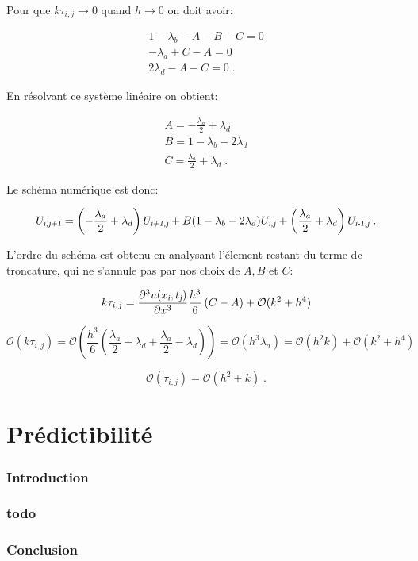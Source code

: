 \documentclass[a4paper, 12pt]{report}
\begin{document}
Pour que $k \tau_{i,j} \to 0$ quand $h \to 0$ on doit avoir:

\begin{align}
  1-\lambda_b - A -B -C = 0\\
  -\lambda_a +C - A =0\\
  2 \lambda_d -A -C = 0\;.
\end{align}

En résolvant ce système linéaire on obtient:

\begin{align}
  A = -\frac{\lambda_a}{2} + \lambda_d\\
  B = 1-\lambda_b - 2\lambda_d\\
  C = \frac{\lambda_a}{2} + \lambda_d\;.
\end{align}

Le schéma numérique est donc:

\begin{equation}
U_{\textsl{i},\textsl{j+1}} = \left ( -\frac{\lambda_a}{2} + \lambda_d \right ) U_{\textsl{i+1},\textsl{j}} + B (1-\lambda_b - 2\lambda_d) U_{\textsl{i},\textsl{j}} + \left (\frac{\lambda_a}{2} + \lambda_d \right ) U_{\textsl{i-1},\textsl{j}} \;.
\end{equation}

L'ordre du schéma est obtenu en analysant l'élement restant du terme de troncature,
qui ne s'annule pas par nos choix de $A,B$ et $C$:

\begin{equation}
    k\tau_{i,j} = \frac{\partial^3 u(x_{\textsl{i}},t_{\textsl{j}})}{\partial x^3} \frac{h^3}{6} \left (C-A \right ) + \mathcal{O}(k^2+h^4)
\end{equation}

\begin{equation}
    \mathcal{O}(k\tau_{i,j}) = \mathcal{O} \left (\frac{h^3}{6} \left ( \frac{\lambda_a}{2} + \lambda_d+\frac{\lambda_a}{2} - \lambda_d \right ) \right ) = \mathcal{O} \left (h^3 \lambda_a \right ) = \mathcal{O} \left (h^2 k \right ) + \mathcal{O}(k^2+h^4)
\end{equation}

\begin{equation}
    \mathcal{O}(\tau_{i,j}) = \mathcal{O} \left (h^2 + k\right )\;.
\end{equation}


\part{Prédictibilité}
\setcounter{section}{0}

\section*{Introduction}


\section{todo}


\section*{Conclusion}
\end{document}
